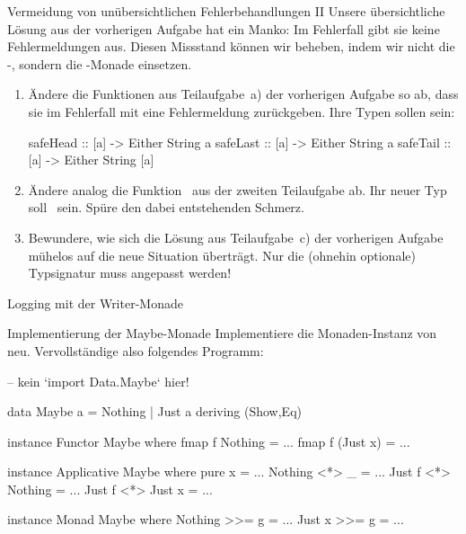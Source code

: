 \documentclass{uebblatt}
\begin{document}
\begin{aufgabe}{Vermeidung von unübersichtlichen Fehlerbehandlungen II}
Unsere übersichtliche Lösung aus der vorherigen Aufgabe hat ein Manko: Im
Fehlerfall gibt sie keine Fehlermeldungen aus. Diesen Missstand können wir
beheben, indem wir nicht die -, sondern die
-Monade einsetzen.

\begin{enumerate}
\item Ändere die Funktionen aus Teilaufgabe~a) der vorherigen Aufgabe so ab,
dass sie im Fehlerfall mit  eine Fehlermeldung zurückgeben.
Ihre Typen sollen sein:

\begin{haskellcode}
safeHead :: [a] -> Either String a
safeLast :: [a] -> Either String a
safeTail :: [a] -> Either String [a]
\end{haskellcode}

\item Ändere analog die Funktion~ aus der zweiten Teilaufgabe
ab. Ihr neuer Typ soll~ sein.
Spüre den dabei entstehenden Schmerz.

\item Bewundere, wie sich die Lösung aus Teilaufgabe~c) der vorherigen Aufgabe
mühelos auf die neue Situation überträgt. Nur die (ohnehin optionale)
Typsignatur muss angepasst werden!
\end{enumerate}
\end{aufgabe}

\begin{aufgabe}{Logging mit der Writer-Monade}
\end{aufgabe}

\begin{aufgabe}{Implementierung der Maybe-Monade}
Implementiere die Monaden-Instanz von~ neu.
Vervollständige also folgendes Programm:

\begin{haskellcode}
-- kein `import Data.Maybe` hier!

data Maybe a = Nothing | Just a deriving (Show,Eq)

instance Functor Maybe where
    fmap f Nothing  = ...
    fmap f (Just x) = ...

instance Applicative Maybe where
    pure x = ...
    Nothing <*> _       = ...
    Just f  <*> Nothing = ...
    Just f  <*> Just x  = ...

instance Monad Maybe where
    Nothing >>= g = ...
    Just x  >>= g = ...
\end{haskellcode}
\end{aufgabe}
\end{document}
